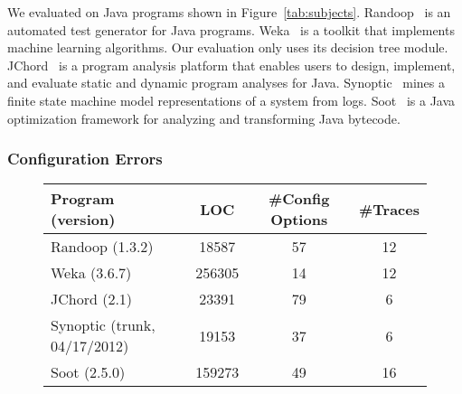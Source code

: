 
We evaluated \ourtool on \subjectnum Java programs shown
in Figure~\ref{tab:subjects}.
Randoop~\cite{PachecoLET2007} is an automated test generator
for Java programs. Weka~\cite{wekaarticle} is a toolkit that implements
machine learning algorithms. Our evaluation
only uses its decision tree module. JChord~\cite{chordtutorial}
is a program analysis platform that enables users to design, implement,
and evaluate static and dynamic program analyses for Java.
Synoptic~\cite{Beschastnikh:2011} mines a finite state machine
model representations of a system from logs.
Soot~\cite{Vallee-Rai-1999} is a Java optimization framework for analyzing and transforming Java bytecode.


\subsubsection{Configuration Errors}



\begin{figure}[t]
\centering
\small{
\setlength{\tabcolsep}{.64\tabcolsep}
\begin{tabular}{|l|c|c|c|}
\hline
 Program (version) & LOC & \#Config Options & \#Traces\\
 \hline
 \hline
 Randoop (1.3.2) & 18587 & 57 & 12\\
 Weka (3.6.7) & 256305 & 14 & 12\\
 JChord (2.1) & 23391 &  79 & 6 \\
 Synoptic (trunk, 04/17/2012) & 19153 & 37 & 6\\
 Soot (2.5.0) & 159273 & 49 & 16 \\
\hline
\end{tabular}
}

\end{figure}


